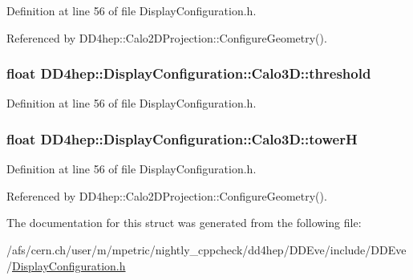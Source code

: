 Definition at line 56 of file DisplayConfiguration.h.

Referenced by DD4hep::Calo2DProjection::ConfigureGeometry().\hypertarget{struct_d_d4hep_1_1_display_configuration_1_1_calo3_d_a5d8b964880761613aa41ee542ce93a48}{
\subsubsection[{threshold}]{\setlength{\rightskip}{0pt plus 5cm}float {\bf DD4hep::DisplayConfiguration::Calo3D::threshold}}}
\label{struct_d_d4hep_1_1_display_configuration_1_1_calo3_d_a5d8b964880761613aa41ee542ce93a48}


Definition at line 56 of file DisplayConfiguration.h.\hypertarget{struct_d_d4hep_1_1_display_configuration_1_1_calo3_d_a85221f1dde131cdf60a25bffef79325f}{
\subsubsection[{towerH}]{\setlength{\rightskip}{0pt plus 5cm}float {\bf DD4hep::DisplayConfiguration::Calo3D::towerH}}}
\label{struct_d_d4hep_1_1_display_configuration_1_1_calo3_d_a85221f1dde131cdf60a25bffef79325f}


Definition at line 56 of file DisplayConfiguration.h.

Referenced by DD4hep::Calo2DProjection::ConfigureGeometry().

The documentation for this struct was generated from the following file:\begin{DoxyCompactItemize}
\item 
/afs/cern.ch/user/m/mpetric/nightly\_\-cppcheck/dd4hep/DDEve/include/DDEve/\hyperlink{_display_configuration_8h}{DisplayConfiguration.h}\end{DoxyCompactItemize}
